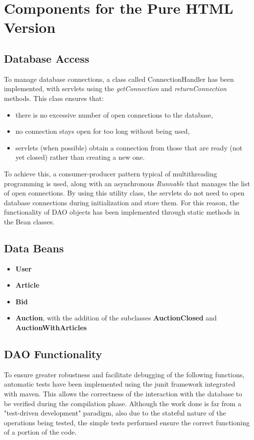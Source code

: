 \documentclass[12pt, a4paper, renqo, final]{amsart}
\let\stdsection\section
\renewcommand{\section}{\newpage\stdsection}
\begin{document}
		\section[PureHTML - Components]{Components for the Pure HTML Version}
			\subsection{Database Access}\label{accessodb}
			To manage database connections, a class called ConnectionHandler has been implemented, with servlets using the \textit{getConnection} and \textit{returnConnection} methods. This class ensures that:
			\begin{itemize}
				\item there is no excessive number of open connections to the database,
				\item no connection stays open for too long without being used,
				\item servlets (when possible) obtain a connection from those that are ready (not yet closed) rather than creating a new one.
			\end{itemize}
			To achieve this, a consumer-producer pattern typical of multithreading programming is used, along with an asynchronous \textit{Runnable} that manages the list of open connections.
			By using this utility class, the servlets do not need to open database connections during initialization and store them. For this reason, the functionality of DAO objects has been implemented through static methods in the Bean classes.
			\subsection{Data Beans}\label{databeans}
			\begin{itemize}
				\item \textbf{User}
				\item \textbf{Article}
				\item \textbf{Bid}
				\item \textbf{Auction}, with the addition of the subclasses \textbf{AuctionClosed} and \textbf{AuctionWithArticles}
			\end{itemize}
			\subsection{DAO Functionality}\label{dao}
			To ensure greater robustness and facilitate debugging of the following functions, automatic tests have been implemented using the junit framework integrated with maven. This allows the correctness of the interaction with the database to be verified during the compilation phase. Although the work done is far from a "test-driven development" paradigm, also due to the stateful nature of the operations being tested, the simple tests performed ensure the correct functioning of a portion of the code.
\end{document}
